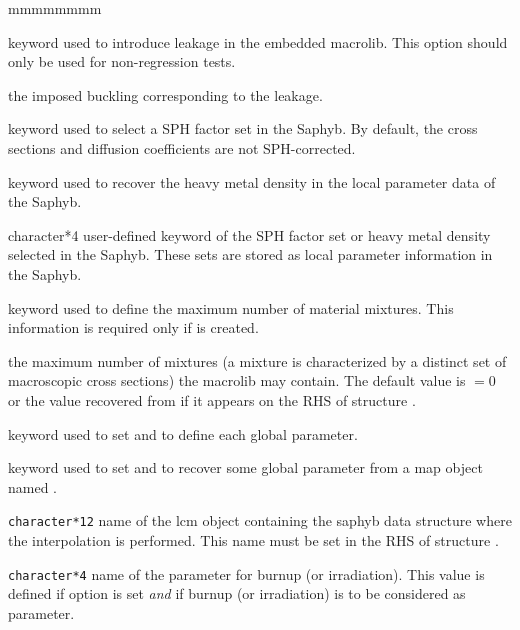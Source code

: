 \begin{ListeDeDescription}{mmmmmmmm}
\item[\moc{LEAK}] keyword used to introduce leakage in the embedded {\sc macrolib}. This option should only be used for non-regression tests.

\item[\dusa{b2}] the imposed buckling corresponding to the leakage.

\item[\moc{EQUI}] keyword used to select a SPH factor set in the Saphyb. By default, the cross sections and diffusion coefficients
are not SPH-corrected.

\item[\moc{MASL}] keyword used to recover the heavy metal density in the local parameter data of the Saphyb. 

\item[\dusa{TEXT4}] character*4 user-defined keyword of the SPH factor set or heavy metal density selected in the Saphyb. These sets are stored as local parameter information in the Saphyb.

\item[\moc{NMIX}] keyword used to define the maximum number of material mixtures. This information is required only if  is created.

\item[\dusa{nmixt}] the maximum number of mixtures (a mixture is characterized by a distinct set of 
macroscopic cross sections) the {\sc macrolib} may contain. The default value is  $=0$ or the value recovered from  if it appears on the RHS
of structure .

\item[\moc{SAPHYB}] keyword used to set  and to define each global parameter.

\item[\moc{TABLE}] keyword used to set  and to recover some global parameter from a {\sc map} object named .

\item[\dusa{SAPNAM}] {\tt character*12} name of the {\sc lcm} object containing the
{\sc saphyb} data structure where the interpolation is performed. This name must be set in the RHS of structure .

\item[\dusa{namburn}] {\tt character*4} name of the parameter for burnup (or irradiation).
This value is defined if option  is set {\sl and} if burnup (or irradiation) is to be considered as parameter.


\end{ListeDeDescription}
